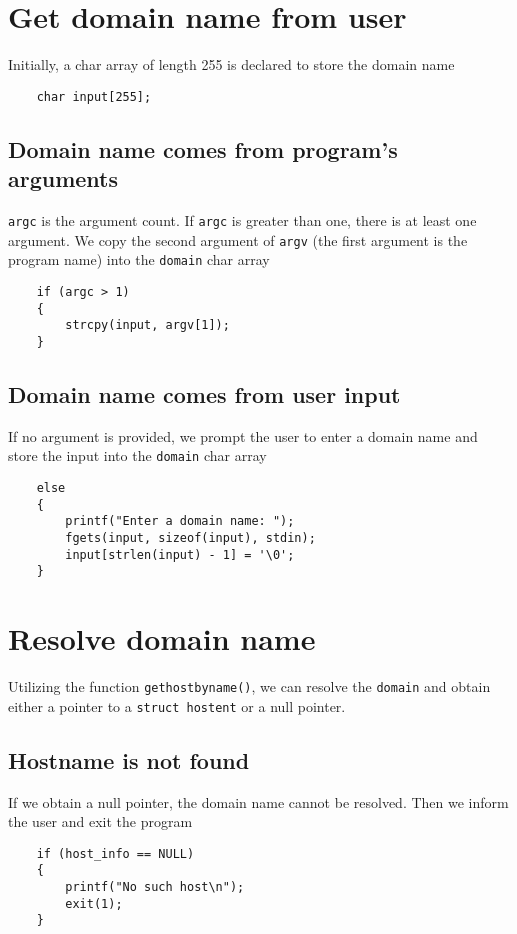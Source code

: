 \documentclass[12pt]{article}
\begin{document}
\section{Get domain name from user}
Initially, a char array of length 255 is declared to store the domain name
\begin{verbatim}
    char input[255];
\end{verbatim}

\subsection{Domain name comes from program's arguments}
\Verb"argc" is the argument count. If \Verb"argc" is greater than one, there is at least one argument. We copy the second argument of \Verb"argv" (the first argument is the program name) into the \Verb"domain" char array
\begin{verbatim}
    if (argc > 1)
    {
        strcpy(input, argv[1]);
    }\end{verbatim}

\subsection{Domain name comes from user input}
If no argument is provided, we prompt the user to enter a domain name and store the input into the \Verb"domain" char array
\begin{verbatim}
    else
    {
        printf("Enter a domain name: ");
        fgets(input, sizeof(input), stdin);
        input[strlen(input) - 1] = '\0';
    }
\end{verbatim}
\clearpage

\section{Resolve domain name}
Utilizing the function \Verb"gethostbyname()", we can resolve the \Verb"domain" and obtain either a pointer to a \Verb"struct hostent" or a null pointer.
\subsection{Hostname is not found}
If we obtain a null pointer, the domain name cannot be resolved. Then we inform the user and exit the program
\begin{verbatim}
    if (host_info == NULL)
    {
        printf("No such host\n");
        exit(1);
    }
\end{verbatim}
\end{document}
